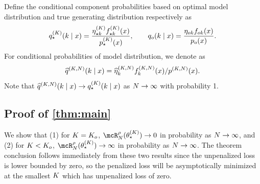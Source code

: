 Define the conditional component probabilities based on optimal model distribution and true generating distribution respectively as
\[
	q^{(K)}_{\star}(k \mid x)= \frac{\eta^{(K)}_{\star k}
  f_{\star k}^{(K)}(x)}{p^{(K)}_{\star}(x)}, \qquad
	q_{o}(k \mid x) = \frac{\eta_{ok}f_{ok}(x)}{p_{o}(x)}.
\]
For conditional probabilities of model distribution, we denote as 
\[
\widehat{q}^{(K, N)}(k \mid x) = \widehat{\eta}^{(K,N)}_{k}f_{k}^{(K,N)}(x) / p^{(K,N)}(x).
\]
Note that $\widehat{q}^{(K,N)} (k\mid x) \rightarrow q^{(K)}_{\star}(k \mid x)$ as $N \rightarrow \infty$ with probability 1.


\subsection{Proof of \cref{thm:main}} \label{pf:main-thm}

We show that (1) for $K = K_o$,  $ \mcR^{\rho}_{\numobs}(\allparam^{(\numcomps)}_{\star}) \rightarrow 0$ in probability as $N \rightarrow \infty$, and (2) for $K < K_o$, $\mcR^{\rho}_{\numobs}(\allparam^{(\numcomps)}_{\star})\rightarrow \infty$ in probability as $N \rightarrow \infty$.
The theorem conclusion follows immediately from these two results since the unpenalized loss is lower bounded by zero,
so the penalized loss will be asymptotically minimized at the smallest $K$ which has unpenalized loss of zero.




